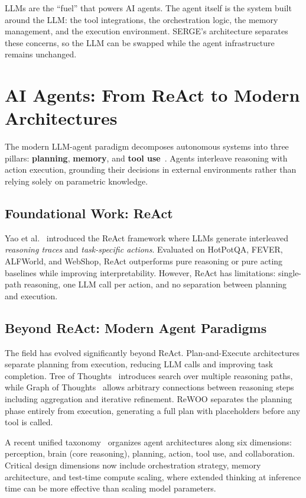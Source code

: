 \documentclass[12pt,a4paper]{report}
\begin{document}
LLMs are the ``fuel'' that powers AI agents. The agent itself is the system built around the LLM: the tool integrations, the orchestration logic, the memory management, and the execution environment. SERGE's architecture separates these concerns, so the LLM can be swapped while the agent infrastructure remains unchanged.

\section{AI Agents: From ReAct to Modern Architectures}

The modern LLM-agent paradigm decomposes autonomous systems into three pillars: \textbf{planning}, \textbf{memory}, and \textbf{tool use}~\cite{weng2023agents}. Agents interleave reasoning with action execution, grounding their decisions in external environments rather than relying solely on parametric knowledge.

\subsection{Foundational Work: ReAct}

Yao et al.~\cite{yao2023react} introduced the ReAct framework where LLMs generate interleaved \textit{reasoning traces} and \textit{task-specific actions}. Evaluated on HotPotQA, FEVER, ALFWorld, and WebShop, ReAct outperforms pure reasoning or pure acting baselines while improving interpretability. However, ReAct has limitations: single-path reasoning, one LLM call per action, and no separation between planning and execution.

\subsection{Beyond ReAct: Modern Agent Paradigms}

The field has evolved significantly beyond ReAct. Plan-and-Execute architectures separate planning from execution, reducing LLM calls and improving task completion. Tree of Thoughts~\cite{yao2023tot} introduces search over multiple reasoning paths, while Graph of Thoughts~\cite{besta2023got} allows arbitrary connections between reasoning steps including aggregation and iterative refinement. ReWOO separates the planning phase entirely from execution, generating a full plan with placeholders before any tool is called.

A recent unified taxonomy~\cite{agenttaxonomy2026} organizes agent architectures along six dimensions: perception, brain (core reasoning), planning, action, tool use, and collaboration. Critical design dimensions now include orchestration strategy, memory architecture, and test-time compute scaling, where extended thinking at inference time can be more effective than scaling model parameters.
\end{document}
